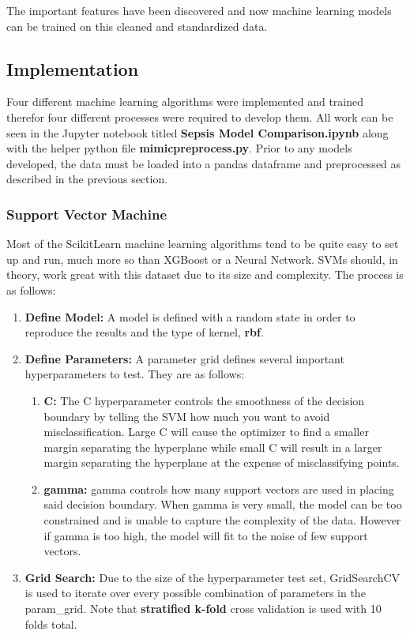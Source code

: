 \documentclass[11pt]{article}
\begin{document}
		The important features have been discovered and now machine learning models can be trained on this cleaned and standardized data.
	
	\subsection{Implementation}
	Four different machine learning algorithms were implemented and trained therefor four different processes were required to develop them. All work can be seen in the Jupyter notebook titled \textbf{Sepsis Model Comparison.ipynb} along with the helper python file \textbf{mimicpreprocess.py}. Prior to any models developed, the data must be loaded into a pandas dataframe and preprocessed as described in the previous section.
	
	\subsubsection{Support Vector Machine}
		Most of the ScikitLearn machine learning algorithms tend to be quite easy to set up and run, much more so than XGBoost or a Neural Network. SVMs should, in theory, work great with this dataset due to its size and complexity. The process is as follows:
		
	\begin{enumerate}
		\item \textbf{Define Model:} A model is defined with a random state in order to reproduce the results and the type of kernel, \textbf{rbf}.
		\item \textbf{Define Parameters:} A parameter grid defines several important hyperparameters to test. They are as follows:
		\begin{enumerate}
			\item \textbf{C:} The C hyperparameter controls the smoothness of the decision boundary by telling the SVM  how much you want to avoid misclassification. Large C will cause the optimizer to find a smaller margin separating the hyperplane while small C will result in a larger margin separating the hyperplane at the expense of misclassifying points.
			\item \textbf{gamma:} gamma controls how many support vectors are used in placing said decision boundary. When gamma is very small, the model can be too constrained and is unable to capture the complexity of the data. However if gamma is too high, the model will fit to the noise of few support vectors.
		\end{enumerate}
		\item \textbf{Grid Search:} Due to the size of the hyperparameter test set, GridSearchCV is used to iterate over every possible combination of parameters in the param\_grid. Note that \textbf{stratified k-fold} cross validation is used with 10 folds total. 
	\end{enumerate}	
\end{document}
